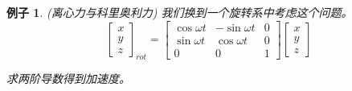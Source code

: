 \documentclass{ctexart}
\numberwithin{equation}{subsection}
\numberwithin{theorem}{subsection}
\numberwithin{definition}{subsection}
\numberwithin{proof}{subsection}
\numberwithin{lemma}{subsection}
\newtheorem{example}    {例子}
\numberwithin{example}{subsection}
\numberwithin{remark}{subsection}
\numberwithin{corollary}{subsection}
\numberwithin{exercise}{subsection}
\numberwithin{problem}{subsection}
\numberwithin{question}{section}
\numberwithin{method}{subsection}
\begin{document}
    \begin{example}
        (离心力与科里奥利力) 我们换到一个旋转系中考虑这个问题。
        \begin{equation}
            \begin{bmatrix}
                x \\
                y \\
                z
            \end{bmatrix}_{rot} = \begin{bmatrix}
                \cos \omega t & -\sin \omega t & 0 \\
                \sin \omega t & \cos \omega t & 0 \\
                0 & 0 & 1
            \end{bmatrix}
            \begin{bmatrix}
                x \\
                y \\
                z
            \end{bmatrix}
        \end{equation}

        求两阶导数得到加速度。


\end{example}
\end{document}
